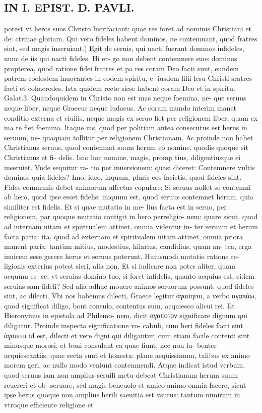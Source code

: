 \documentclass{article}
\begin{document}
\begin{pages}
\section*{IN I. EPIST. D. PAVLI. }
\marginpar{[ p.120 ]}\pstart potest vt heros suos Christo lucrifaciant: quae res foret ad nominis Christiani et de: ctrinae gloriam.  \pend\pstart Qui vero fideles habent dominos, ne contemnant, quod fratres sint, sed magis inseruiant.) Egit de seruis, qui nacti fuerant dommos infideles, nunc de iis qui nacti fideles. Hi er- go non debent contemnere suos dominos propterea, quod ratione fidei fratres et pa res coram Deo facti sunt, eundem patrem coelestem inuocantes in eodem spiritu, e- iusdem filii lesu Christi sratres facti et cohaeredes. Ista quidem recte sicse habent coram Deo et in spiritu. Galat.3. Quandoquidem in Christo non est mas neque foemina, ne- que seruus neque liber, neque Graecus neque ludaeus. Ac coram mundo interim manet conditio externa et ciuilis, neque magis ex seruo fiet per religionem liber, quam ex ma re fiet foemina. ltaque ius, quod per politiam antea consecutus est herus in seruum, ne- quaquam tollitur per religionem Christianam. Ac proinde non habet Christianus seruus, quod contemnat suum herum eo nomine, quodis quoque sit Christianus et fi- delis. Imo hoc nomine, magis, promp tius, diligentiusque ei inseruiet. Vnde sequitur ra- tio per inuersionem: quasi diceret: Contemnere vultis dominos quia fideles? Imo, ideo, inquam, pluris eos facietis, quod fideles sint. Fides communis debet animorum affectus copulare: Si seruus nollet se contemni ab hero, quod ipse esset fidelis: iniquum est, quod seruus contemnet herum, quia similiter est fidelis. Et si quae mutatio in me- lius facta est in seruo, per religionem, par quoque mutatio contigit in hero perreligio- nem: quare sicut, quod ad internam uitam et spiritualem attinet, omnia videntur in- ter seruum et herum facta paria: ita, quod ad externam et spiritualem uitam attinet, omnia priora manent paria: tantùm mitius, modestius, hilarius, candidius, quam an- tea, erga inuicem sese gerere herus et seruus poterunt. Huiusmodi mutatio ratione re- ligionis exterius potest sieri, alia non. Et si iudicare non potes aliter, quam aequum es- se, vt seruias domino tuo, si foret infidelis, quanto aequius est, eidem seruias sam fideli? Sed alia adhuc mouere animos seruorum possunt: quod fideles sint, ac dilecti. Vbi nos habemus dilecti, Graece legitur ἀγαπηrοι, a verbo αγαπάω, quod significat diligo, bont consulo, contentus sum, acquiesco alicui rei. Et Hieronymus in epistola ad Philemo- nem, dicit αγαποτον significare dignum qui diligatur. Proinde inspecta significatione vo- cabuli, cum heri fideles facti sint ἀγαποτι id est, dilecti et vere digni qui diligantur, cum etiam facile contenti sint minusque morosi, et boni consulant ea quae fiunt, nec non lu- benter acquiescantiis, quae recta sunt et honesta: plane aequissimum, talibus ex animo morem geri, ac nullo modo veniunt contemnendi. Atque indicat istud verbum, quod seruus iam non amplius seruili metu debeat Christianum herum suum reuereri et ob- seruare, sed magis beneuolo et amico animo omnia facere, sicut ipse herus quoque non amplius herili saeuitia est vsurus: tantum nimirum in vtroque efficiente religione et 
\end{pages}
\end{document}
